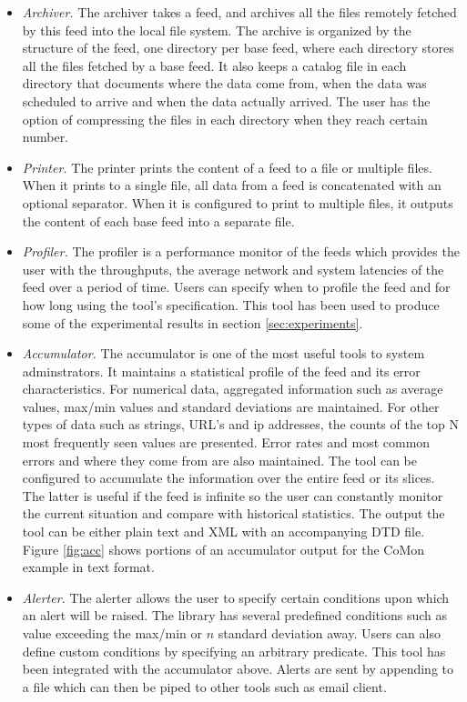 \begin{itemize}
\item {\em Archiver.} The archiver takes a feed, and archives all the files
remotely fetched by this feed into the local file system. The archive
is organized by the structure of the feed, one directory per base feed,
where each directory stores all the files fetched by a base feed. 
It also keeps a catalog file in each directory that documents where 
the data come from, when the data was scheduled to arrive and when
the data actually arrived. The user has the option of compressing
the files in each directory when they reach certain number. 

\item {\em Printer.} The printer prints the content of a feed to a file or
multiple files. When it prints to a single file, all data from a feed is
concatenated with an optional separator. When it is configured to print
to multiple files, it outputs the content of each base feed into a separate
file.

\item {\em Profiler.} The profiler is a performance monitor of the feeds which
provides the user with the throughputs, the average network and system latencies
of the feed over a period of time. Users can specify when to profile the feed and
for how long using the tool's specification. This tool has been used to produce
some of the experimental results in section \ref{sec:experiments}.

\item {\em Accumulator.} The accumulator is one of the most useful tools to system
adminstrators. It maintains a statistical profile of the feed and
its error characteristics. For numerical data, aggregated information such as 
average values, max/min values and standard deviations are maintained. For other
types of data such as strings, URL's and ip addresses, the counts of the top N
most frequently seen values are presented. Error rates and most common errors
and where they come from are also maintained. The tool can be configured to
accumulate the information over the entire feed or its slices. The latter is
useful if the feed is infinite so the user can constantly monitor the 
current situation and compare with historical statistics. 
The output the tool can be either plain text and XML with an
accompanying DTD file. Figure \ref{fig:acc} shows portions of an accumulator
output for the CoMon example in text format.

\item {\em Alerter.} The alerter allows the user to specify certain conditions
upon which an alert will be raised. The library has several predefined
conditions such as value exceeding the max/min or $n$ standard deviation away. 
Users can also define custom conditions by specifying an arbitrary predicate. 
This tool has been integrated with the accumulator above. Alerts are sent by
appending to a file which can then be piped to other tools such as email
client.


\end{itemize}
